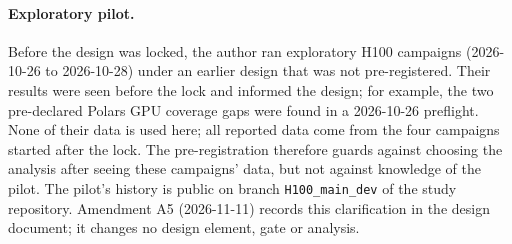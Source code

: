 \documentclass[11pt]{article}
\begin{document}
\paragraph{Exploratory pilot.} Before the design was locked, the author ran exploratory H100 campaigns
(2026-10-26 to 2026-10-28) under an earlier design that was not
pre-registered. Their results were seen before the lock and informed the
design; for example, the two pre-declared Polars GPU coverage gaps were found
in a 2026-10-26 preflight. None of their data is used here; all reported data
come from the four campaigns started after the lock. The pre-registration
therefore guards against choosing the analysis after seeing these campaigns'
data, but not against knowledge of the pilot. The pilot's history is public on
branch \texttt{H100\_main\_dev} of the study repository. Amendment A5 (2026-11-11) records this
clarification in the design document; it changes no design element, gate or
analysis.
\end{document}
